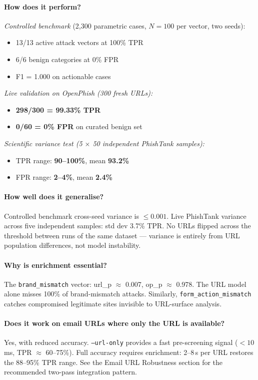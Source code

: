 \documentclass[11pt,a4paper]{article}
\newcommand{\code}[1]{\texttt{#1}}
\begin{document}
\paragraph{How does it perform?}

\textit{Controlled benchmark} (2,300 parametric cases, $N=100$ per
vector, two seeds):
\begin{itemize}[noitemsep]
  \item 13/13 active attack vectors at 100\% TPR
  \item 6/6 benign categories at 0\% FPR
  \item F1 = 1.000 on actionable cases
\end{itemize}

\textit{Live validation on OpenPhish (300 fresh URLs):}
\begin{itemize}[noitemsep]
  \item \textbf{298/300 = 99.33\% TPR}
  \item \textbf{0/60 = 0\% FPR} on curated benign set
\end{itemize}

\textit{Scientific variance test (5 $\times$ 50 independent PhishTank samples):}
\begin{itemize}[noitemsep]
  \item TPR range: \textbf{90--100\%}, mean \textbf{93.2\%}
  \item FPR range: \textbf{2--4\%}, mean \textbf{2.4\%}
\end{itemize}

\paragraph{How well does it generalise?}
Controlled benchmark cross-seed variance is $\leq 0.001$. Live
PhishTank variance across five independent samples: std dev 3.7\%
TPR. No URLs flipped across the threshold between runs of the same
dataset --- variance is entirely from URL population differences,
not model instability.

\paragraph{Why is enrichment essential?}
The \code{brand\_mismatch} vector: url\_p $\approx$ 0.007,
op\_p $\approx$ 0.978. The URL model alone misses 100\% of
brand-mismatch attacks. Similarly, \code{form\_action\_mismatch}
catches compromised legitimate sites invisible to URL-surface analysis.

\paragraph{Does it work on email URLs where only the URL is available?}
Yes, with reduced accuracy. \code{--url-only} provides a fast
pre-screening signal ($< 10$\,ms, TPR $\approx$ 60--75\%). Full
accuracy requires enrichment: 2--8\,s per URL restores the
88--95\% TPR range. See the Email URL Robustness section for the
recommended two-pass integration pattern.
\end{document}
